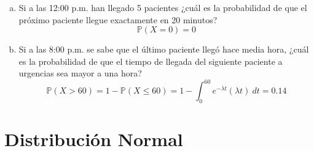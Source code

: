\documentclass[11pt, spanish]{article}
\begin{document}
\begin{enumerate}[(a)]
\item Si a las 12:00 p.m. han llegado 5 pacientes ¿cuál es la probabilidad de que el
próximo paciente llegue exactamente en 20 minutos?
$$\mathbb{P}(X = 0) = 0$$

\item Si a las 8:00 p.m. se sabe que el último paciente llegó hace media hora, ¿cuál es
la probabilidad de que el tiempo de llegada del siguiente paciente a urgencias sea mayor a
una hora?
$$\mathbb{P}(X > 60) = 1 - \mathbb{P}(X \leq  60) = 1 - \int_{0}^{60} e^{-\lambda t}(\lambda t)\ dt = 0.14$$

\end{enumerate}

\pagebreak
\section{Distribución Normal}
\end{document}
